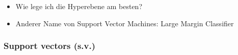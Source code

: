 \begin{frame}
{        \vspace{2mm}

        \begin{itemize}
            \item<2-> Wie lege ich die Hyperebene am besten?

            \item<3-> Anderer Name von Support Vector Machines: Large Margin Classifier
        \end{itemize}
    }
\end{frame}

\begin{frame}
    \frametitle{Support vectors (s.v.)}


\end{frame}
